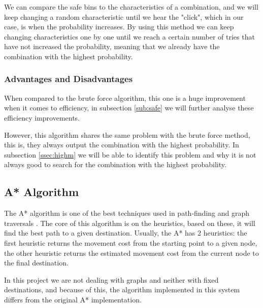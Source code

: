 \documentclass[12pt,a4paper,oneside]{memoir}
\begin{document}
\par

We can compare the safe bins to the characteristics of a combination, and we will keep changing a random characteristic until we hear the "click", which in our case, is when the probability increases. By using this method we can keep changing characteristics one by one until we reach a certain number of tries that have not increased the probability, meaning that we already have the combination with the highest probability.



    \subsubsection{Advantages and Disadvantages}
    \label{sec:safeadv}
    When compared to the brute force algorithm, this one is a huge improvement when it comes to  efficiency, in subsection \ref{sub:safe} we will further analyse these efficiency improvements.
    
    \par
    
    However, this algorithm shares the same problem with the brute force method, this is, they always output the combination with the highest probability. In subsection \ref{ssec:highm} we will be able to identify this problem and why it is not always good to search for the combination with the highest probability.
    


\subsection{A* Algorithm}
\label{sec:star}
The A* algorithm is one of the best techniques used in path-finding and graph traversals \cite{A*}. The core of this algorithm is on the heuristics, based on these, it will find the best path to a given destination. Usually, the A* has 2 heuristics: the first heuristic returns the movement cost from the starting point to a given node, the other heuristic returns the estimated movement cost from the current node to the final destination.

\par

In this project we are not dealing with graphs and neither with fixed destinations, and because of this, the algorithm implemented in this system differs from the original A* implementation. 
\end{document}
